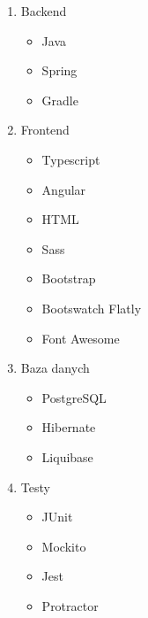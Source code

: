 \begin{enumerate}
    \item Backend
    \begin{itemize}
        \item Java\cite{tech:java}
        \item Spring\cite{tech:spring}
        \item Gradle\cite{tech:gradle}
    \end{itemize}

    \item Frontend
    \begin{itemize}
        \item Typescript\cite{tech:typescript}
        \item Angular\cite{tech:angular}
        \item HTML\cite{tech:html}
        \item Sass\cite{tech:sass}
        \item Bootstrap\cite{tech:bootstrap}
        \item Bootswatch Flatly\cite{tech:bootswatch}
        \item Font Awesome\cite{tech:font-awesome}
    \end{itemize}

    \item Baza danych
    \begin{itemize}
        \item PostgreSQL\cite{tech:postgresql}
        \item Hibernate\cite{tech:hibernate}
        \item Liquibase\cite{tech:liquibase}
    \end{itemize}

    \item Testy
    \begin{itemize}
        \item JUnit\cite{tech:junit}
        \item Mockito\cite{tech:mockito}
        \item Jest\cite{tech:jest}
        \item Protractor\cite{tech:protractor}
    \end{itemize}


\end{enumerate}
